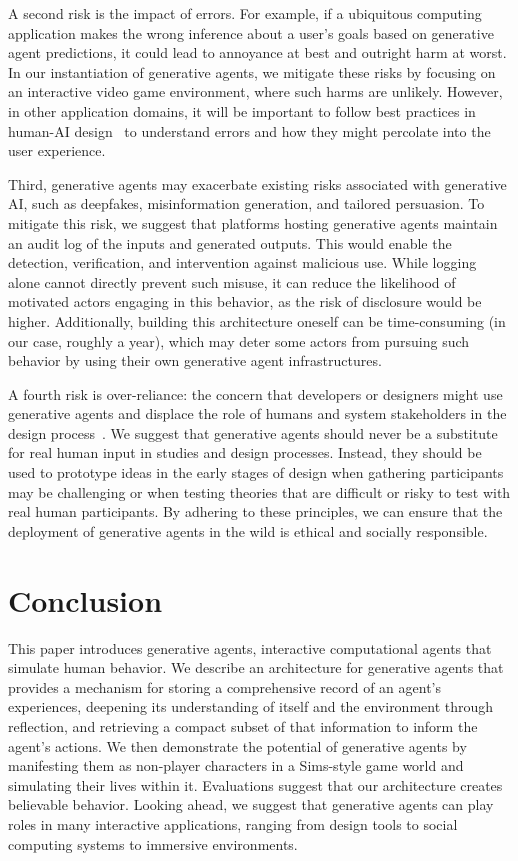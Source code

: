 A second risk is the impact of errors. For example, if a ubiquitous computing application makes the wrong inference about a user's goals based on generative agent predictions, it could lead to annoyance at best and outright harm at worst. In our instantiation of generative agents, we mitigate these risks by focusing on an interactive video game environment, where such harms are unlikely. However, in other application domains, it will be important to follow best practices in human-AI design~\cite{amershi2019guidelines, yang2020re} to understand errors and how they might percolate into the user experience.

Third, generative agents may exacerbate existing risks associated with generative AI, such as deepfakes, misinformation generation, and tailored persuasion. To mitigate this risk, we suggest that platforms hosting generative agents maintain an audit log of the inputs and generated outputs. This would enable the detection, verification, and intervention against malicious use. While logging alone cannot directly prevent such misuse, it can reduce the likelihood of motivated actors engaging in this behavior, as the risk of disclosure would be higher. Additionally, building this architecture oneself can be time-consuming (in our case, roughly a year), which may deter some actors from pursuing such behavior by using their own generative agent infrastructures.

A fourth risk is over-reliance: the concern that developers or designers might use generative agents and displace the role of humans and system stakeholders in the design process~\cite{9_park2022socialsimulacra}. We suggest that generative agents should never be a substitute for real human input in studies and design processes. Instead, they should be used to prototype ideas in the early stages of design when gathering participants may be challenging or when testing theories that are difficult or risky to test with real human participants. By adhering to these principles, we can ensure that the deployment of generative agents in the wild is ethical and socially responsible.

\section{Conclusion}
This paper introduces generative agents, interactive computational agents that simulate human behavior. We describe an architecture for generative agents that provides a mechanism for storing a comprehensive record of an agent's experiences, deepening its understanding of itself and the environment through reflection, and retrieving a compact subset of that information to inform the agent's actions. We then demonstrate the potential of generative agents by manifesting them as non-player characters in a Sims-style game world and simulating their lives within it. Evaluations suggest that our architecture creates believable behavior. Looking ahead, we suggest that generative agents can play roles in many interactive applications, ranging from design tools to social computing systems to immersive environments.


